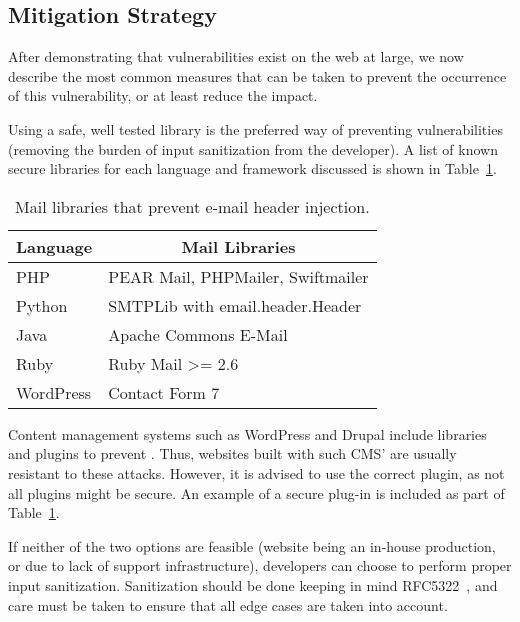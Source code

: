 \subsection{Mitigation Strategy}
\label{disc:mitigation}
After demonstrating that \ehi vulnerabilities exist on the web at large, we now describe the most common measures that can be taken to prevent the occurrence of this vulnerability, or at least reduce the impact.

Using a safe, well tested \email library is the preferred way of
preventing \ehi vulnerabilities (removing the burden of input
sanitization from the developer). A list of known secure libraries for
each language and framework discussed is shown in
Table~\ref{tab:maillib}.
	\begin{table}[tbp]
		\centering
		\scriptsize
		\begin{tabular}{|l|l|}
			\hline
			\multicolumn{1}{|c|}{\textbf{Language}} &
			\multicolumn{1}{c|}{\textbf{Mail Libraries}} \\
			\hline
			PHP & {{PEAR Mail\cite{Hagenbuch2016}, PHPMailer\cite{PHPMailer2016}, Swiftmailer\cite{SwiftMailer2016}}}\\
			\hline
			Python & SMTPLib with email.header.Header\\
			\hline
			Java & Apache Commons E-Mail\cite{ACE2016}\\
			\hline
			Ruby & Ruby Mail \textgreater{}= 2.6\cite{RubyMailGem2016}\\
			\hline
			WordPress & Contact Form 7\cite{CF7}\\
			\hline
		\end{tabular}
		\caption[]{Mail libraries that prevent e-mail header injection.}
		\label{tab:maillib}
	\end{table}

Content management systems such as WordPress and Drupal include
libraries and plugins to prevent \ehi. Thus, websites built with such
CMS' are usually resistant to these attacks. However, it is advised to
use the correct \email plugin, as not all plugins might be secure. An
example of a secure plug-in is included as part of
Table~\ref{tab:maillib}.
	
If neither of the two options are feasible (website being an in-house
production, or due to lack of support infrastructure), developers can
choose to perform proper input sanitization. Sanitization should be
done keeping in mind RFC5322~\cite{rfc5322}, and care must be taken to
ensure that all edge cases are taken into account.
	

